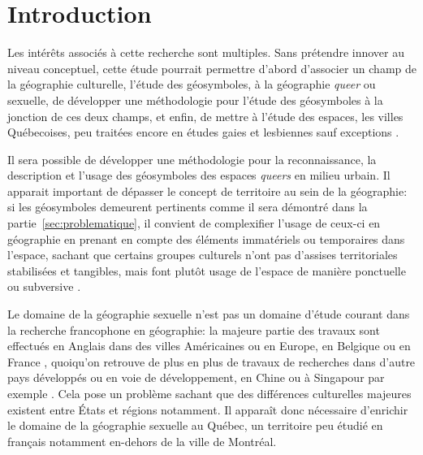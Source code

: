 \chapter*{Introduction}         %


Les intérêts associés à cette recherche sont multiples.
Sans prétendre innover au niveau conceptuel, cette étude pourrait permettre d'abord d'associer un champ de la géographie culturelle, l'étude des géosymboles, à la géographie \emph{queer} ou sexuelle, de développer une méthodologie pour l'étude des géosymboles à la jonction de ces deux champs, et enfin, de mettre à l'étude des espaces, les villes Québecoises, peu traitées encore en études gaies et lesbiennes sauf exceptions \parencite{Chamberland1993a,Podmore2006,Podmore2001,Hebert2012,Hunt2008,Laprade2014}.

Il sera possible de développer une méthodologie pour la reconnaissance, la description et l'usage des géosymboles des espaces \emph{queers} en milieu urbain.
Il apparait important de dépasser le concept de territoire au sein de la
géographie: si les géosymboles demeurent pertinents comme il sera démontré dans la partie~\ref{sec:problematique}, il convient de complexifier l'usage de ceux-ci en géographie en prenant en compte des éléments immatériels ou temporaires dans l'espace, sachant que certains groupes culturels n'ont pas d'assises territoriales stabilisées et tangibles, mais font plutôt usage de l'espace de manière ponctuelle ou subversive \parencite{Talburt2012}.

Le domaine de la géographie sexuelle n'est pas un domaine d'étude courant dans
la recherche francophone en géographie: la majeure partie des travaux sont effectués en Anglais dans des villes Américaines ou en Europe, en Belgique ou en France \parencite{Blidon2010,Blidon2006,Cattan2010,Deligne2006}, quoiqu'on retrouve de plus en plus de travaux de recherches dans d'autre pays développés ou en voie de développement, en Chine ou à Singapour par exemple \parencite{Oswin2014a,Kong2012}.
Cela pose un problème sachant que des différences culturelles majeures existent entre États et régions notamment. 
Il apparaît donc nécessaire d'enrichir le domaine de la géographie sexuelle au Québec, un territoire peu étudié en français notamment en-dehors de la ville de Montréal.



